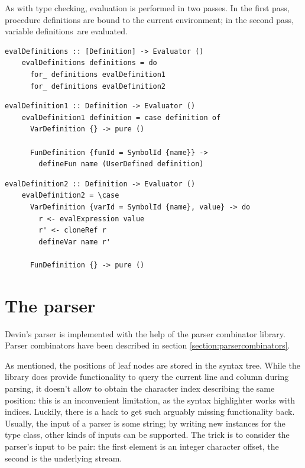 \documentclass[UdineBachThesis,american,11pt,draft]{PhdThesis}
\begin{document}
  As with type checking, evaluation is performed in two passes. In the first
  pass, procedure definitions are bound to the current environment; in the
  second pass, variable definitions~are evaluated.

  \begin{lstlisting}[gobble=4,basicstyle=\ttfamily\small]
    evalDefinitions :: [Definition] -> Evaluator ()
    evalDefinitions definitions = do
      for_ definitions evalDefinition1
      for_ definitions evalDefinition2
  \end{lstlisting}

  \begin{lstlisting}[gobble=4,basicstyle=\ttfamily\small]
    evalDefinition1 :: Definition -> Evaluator ()
    evalDefinition1 definition = case definition of
      VarDefinition {} -> pure ()

      FunDefinition {funId = SymbolId {name}} ->
        defineFun name (UserDefined definition)
  \end{lstlisting}

  \begin{lstlisting}[gobble=4,basicstyle=\ttfamily\small]
    evalDefinition2 :: Definition -> Evaluator ()
    evalDefinition2 = \case
      VarDefinition {varId = SymbolId {name}, value} -> do
        r <- evalExpression value
        r' <- cloneRef r
        defineVar name r'

      FunDefinition {} -> pure ()
  \end{lstlisting}

  \section{The parser}

  Devin's parser is implemented with the help of the \lstinline@parsec@ parser
  combinator library. Parser combinators have been described in section
  \ref{section:parsercombinators}.

  As mentioned, the positions of leaf nodes are stored in the syntax tree. While
  the \lstinline@parsec@ library does provide functionality to query the current
  line and column during parsing, it doesn't allow to obtain the character index
  describing the same position: this is an inconvenient limitation, as the
  syntax highlighter works with indices. Luckily, there is a hack to get such
  arguably missing functionality back. Usually, the input of a
  \lstinline@parsec@ parser is some string; by writing new instances for the
  \lstinline@Stream@ type class, other kinds of inputs can be supported. The
  trick is to consider the parser's input to be pair: the first element is an
  integer character offset, the second is the underlying stream.
\end{document}
